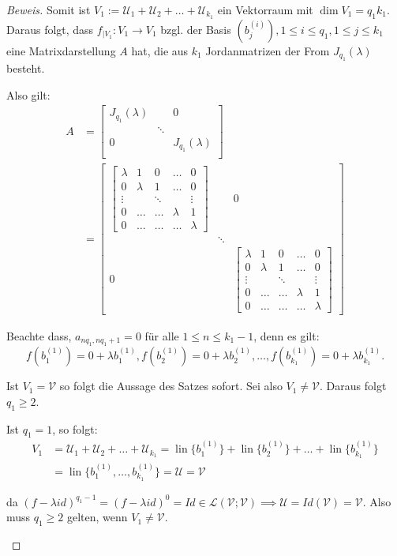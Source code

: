\documentclass{article}
\newcommand{\LL}{\mathcal{L}}
\newcommand{\V}{\mathcal{V}}
\newcommand{\U}{\mathcal{U}}
\newcommand{\basis}[2]{b_{#1}^{({#2})}}
\newcommand{\lam}{\lambda}
\newcommand{\flam}[1]{(f-{\lambda}id)^{{#1}}}
\newcommand{\funcdown}[2]{{{#1}}_{|{#2}}\colon{#2}\to{#2}}
\newcommand{\jmatrix}{
  \begin{bmatrix}
    \lam   & 1     & 0      & \dots & 0      \\
    0      & \lam  & 1      & \dots & 0      \\
    \vdots &       & \ddots &       & \vdots \\
    0      & \dots & \dots  & \lam  & 1      \\
    0      & \dots & \dots  & \dots & \lam
  \end{bmatrix}}
\DeclareMathOperator{\lin}{lin}
\begin{document}
\begin{proof}[Beweis]
  Somit ist $V_1 := \U_1 + \U_2 + \dots + \U_{k_1}$ ein Vektorraum mit $\dim V_1 = q_1k_1$.
  Daraus folgt, dass $\funcdown{f}{V_1}$ bzgl. der Basis
  $(\basis{j}{i}), 1 \le i \le q_1, 1 \le j \le k_1$ eine Matrixdarstellung $A$ hat, die aus
  $k_1$ Jordanmatrizen der From $J_{q_1}(\lam)$ besteht.

  \begin{tcolorbox}
    Also gilt:
    \begin{align*}
      A & =
          \begin{bmatrix}
            J_{q_1}(\lam) & & 0 \\
            & \ddots & \\
            0 & & J_{q_1}(\lam) \\
          \end{bmatrix} \\
        & =
          \begin{bmatrix}
            \jmatrix & & 0 \\
            & \ddots & \\
            0 & & \jmatrix
          \end{bmatrix}
    \end{align*}

    Beachte dass, $a_{nq_1,nq_1+1}=0$ für alle $1 \le n \le k_1-1$, denn es gilt:
    \begin{equation*}
      f(\basis{1}{1}) = 0 + {\lam} \basis{1}{1} ,
      f(\basis{2}{1}) = 0 + {\lam} \basis{2}{1} ,
      \dots ,
      f(\basis{k_1}{1}) = 0 + {\lam} \basis{k_1}{1}.
    \end{equation*}

  \end{tcolorbox}

  Ist $V_1 = \V$ so folgt die Aussage des Satzes sofort. Sei also $V_1 \ne \V$. Daraus folgt $q_1 \ge 2$.

  \begin{tcolorbox}
    Ist $q_1 = 1$, so folgt:
    \begin{align*}
      V_1 &= \U_1 + \U_2 + \dots + \U_{k_1} = \lin \{\basis{1}{1}\} + \lin \{\basis{2}{1}\} + \dots + \lin \{\basis{k_1}{1}\} \\
          &= \lin \{\basis{1}{1}, \dots , \basis{k_1}{1}\} = \U = \V
    \end{align*}

    da $\flam{q_1-1} = \flam{0} = Id \in \LL(\V;\V) \implies \U = Id(\V) = \V$.
    Also muss $q_1 \ge 2$ gelten, wenn $V_1 \ne \V$.
  \end{tcolorbox}


\end{proof}
\end{document}

